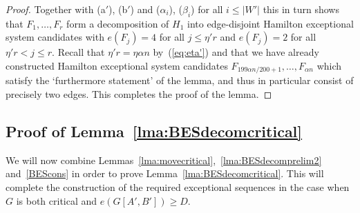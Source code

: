 \documentclass{memo-l}
\numberwithin{section}{chapter}
\numberwithin{equation}{section}
\numberwithin{firstthm}{section}
\numberwithin{figure}{section}
\begin{document}
{\begin{proof}
Together with (a$'$), (b$'$) and ($\alpha_i$), ($\beta_i$)
for all $i\le |W'|$ this in turn shows that $F_1,\dots,F_r$ form a decomposition of $H_1$
into edge-disjoint Hamilton exceptional system candidates with
$e(F_j)=4$ for all $j\le \eta' r$ and $e(F_j)=2$ for all $\eta' r<j\le r$. Recall that $\eta' r=\eta \alpha n$
by~(\ref{eq:eta'}) and that we have already constructed Hamilton exceptional system candidates $F_{199\alpha n/200+1},\dots,F_{ \alpha n}$
which satisfy the `furthermore statement' of the lemma, and thus in particular consist of precisely two edges.
This completes the proof of the lemma.
\end{proof}

\subsection{Proof of Lemma~\ref{lma:BESdecomcritical}}

We will now combine Lemmas~\ref{lma:movecritical},~\ref{lma:BESdecomprelim2} and~\ref{BEScons} in order
to prove Lemma~\ref{lma:BESdecomcritical}.
This will complete the construction of the required exceptional sequences in the case when $G$ is both critical and $e(G[A',B'])\ge D$.

}
\end{document}
